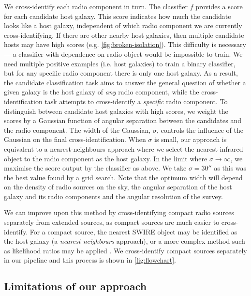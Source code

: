     {We cross-identify each radio component in turn. The classifier $f$
    provides a score for each candidate host galaxy. This score indicates how
    much the candidate looks like a host galaxy, independent of which radio
    component we are currently cross-identifying. If there are other nearby host
    galaxies, then multiple candidate hosts may have high scores (e.g.
    \autoref{fig:broken-isolation}). This difficulty is necessary --- a classifier
    with dependence on radio object would be impossible to train. We
    need multiple positive examples (i.e. host galaxies) to train a binary classifier, but
    for any specific radio component there is only one host galaxy. As a
    result, the candidate classification task aims to answer the general question
    of whether a given galaxy is the host galaxy of \emph{any} radio
    component, while the cross-identification task attempts to cross-identify
    a \emph{specific} radio component. To distinguish between candidate host
    galaxies with high scores, we weight the scores by a Gaussian function of
    angular separation between the candidates and the radio component.} The
    width of the Gaussian, $\sigma$, controls the influence of the Gaussian on
    the final cross-identification. When $\sigma$ is small, our approach is
    equivalent to a nearest-neighbours approach where we select the nearest
    infrared object to the radio component as the host galaxy. In the limit
    where $\sigma \to \infty$, we maximise the score output by the
    classifier as above. We take $\sigma = 30''$ as this was the best value
    found by a grid search. {Note that the optimum width will depend on
    the density of radio sources on the sky, the angular separation of the
    host galaxy and its radio components and the angular resolution of the survey.}

    {We can improve upon this method by cross-identifying compact radio sources
    separately from extended sources, as compact sources are much easier to
    cross-identify. For a compact source, the nearest SWIRE object may be
    identified as the host galaxy (a \emph{nearest-neighbours} approach), or a
    more complex method such as likelihood ratios may be applied
    \citep[see][]{weston18lrpy}. We cross-identify compact sources separately
    in our pipeline and this process is shown in \autoref{fig:flowchart}.}

  \subsection{Limitations of our approach}
    \label{sec:atlas-xid-limitations}

